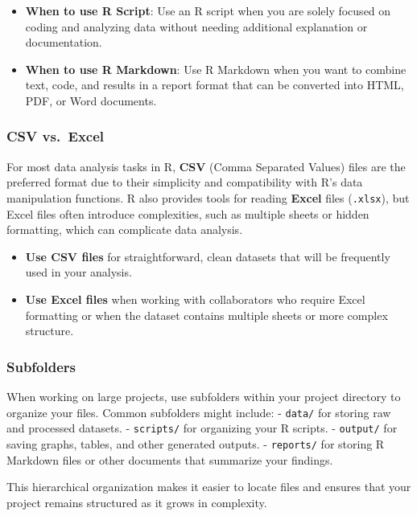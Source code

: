 \documentclass[
]{book}
\providecommand{\tightlist}{%
  \setlength{\itemsep}{0pt}\setlength{\parskip}{0pt}}
\begin{document}
\begin{itemize}
\tightlist
\item
  \textbf{When to use R Script}: Use an R script when you are solely focused on coding and analyzing data without needing additional explanation or documentation.
\item
  \textbf{When to use R Markdown}: Use R Markdown when you want to combine text, code, and results in a report format that can be converted into HTML, PDF, or Word documents.
\end{itemize}

\subsubsection*{CSV vs.~Excel}\label{csv-vs.-excel}

For most data analysis tasks in R, \textbf{CSV} (Comma Separated Values) files are the preferred format due to their simplicity and compatibility with R's data manipulation functions. R also provides tools for reading \textbf{Excel} files (\texttt{.xlsx}), but Excel files often introduce complexities, such as multiple sheets or hidden formatting, which can complicate data analysis.

\begin{itemize}
\tightlist
\item
  \textbf{Use CSV files} for straightforward, clean datasets that will be frequently used in your analysis.
\item
  \textbf{Use Excel files} when working with collaborators who require Excel formatting or when the dataset contains multiple sheets or more complex structure.
\end{itemize}

\subsubsection*{Subfolders}\label{subfolders}

When working on large projects, use subfolders within your project directory to organize your files. Common subfolders might include:
- \texttt{data/} for storing raw and processed datasets.
- \texttt{scripts/} for organizing your R scripts.
- \texttt{output/} for saving graphs, tables, and other generated outputs.
- \texttt{reports/} for storing R Markdown files or other documents that summarize your findings.

This hierarchical organization makes it easier to locate files and ensures that your project remains structured as it grows in complexity.
\end{document}
